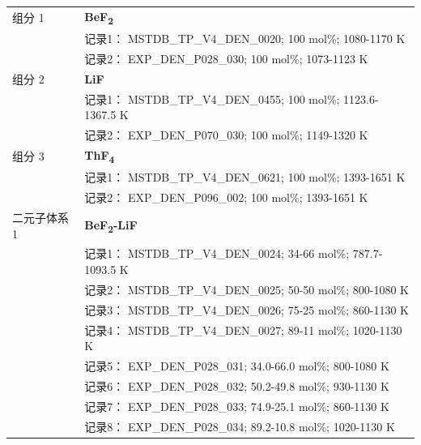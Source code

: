 \documentclass[12pt]{article}
\begin{document}
{\begin{longtable}[]{@{}
  >{\raggedright\arraybackslash}p{}
  >{\raggedright\arraybackslash}p{}@{}}
组分 1  & \textbf{BeF\textsubscript{2}} \\
 & 记录1： MSTDB\_TP\_V4\_DEN\_0020; 100 mol\%; 1080-1170 K \\
 & 记录2： EXP\_DEN\_P028\_030; 100 mol\%; 1073-1123 K  \\

组分 2  & \textbf{LiF} \\
 & 记录1： MSTDB\_TP\_V4\_DEN\_0455; 100 mol\%; 1123.6-1367.5 K \\
 & 记录2： EXP\_DEN\_P070\_030; 100 mol\%; 1149-1320 K  \\

组分 3  & \textbf{ThF\textsubscript{4}} \\
 & 记录1： MSTDB\_TP\_V4\_DEN\_0621; 100 mol\%; 1393-1651 K \\
 & 记录2： EXP\_DEN\_P096\_002; 100 mol\%; 1393-1651 K  \\

二元子体系 1  & \textbf{BeF\textsubscript{2}-LiF} \\
 & 记录1： MSTDB\_TP\_V4\_DEN\_0024; 34-66 mol\%; 787.7-1093.5 K \\
 & 记录2： MSTDB\_TP\_V4\_DEN\_0025; 50-50 mol\%; 800-1080 K \\
 & 记录3： MSTDB\_TP\_V4\_DEN\_0026; 75-25 mol\%; 860-1130 K \\
 & 记录4： MSTDB\_TP\_V4\_DEN\_0027; 89-11 mol\%; 1020-1130 K \\
 & 记录5： EXP\_DEN\_P028\_031; 34.0-66.0 mol\%; 800-1080 K \\
 & 记录6： EXP\_DEN\_P028\_032; 50.2-49.8 mol\%; 930-1130 K \\
 & 记录7： EXP\_DEN\_P028\_033; 74.9-25.1 mol\%; 860-1130 K \\
 & 记录8： EXP\_DEN\_P028\_034; 89.2-10.8 mol\%; 1020-1130 K  \\


\end{longtable}}
\end{document}
